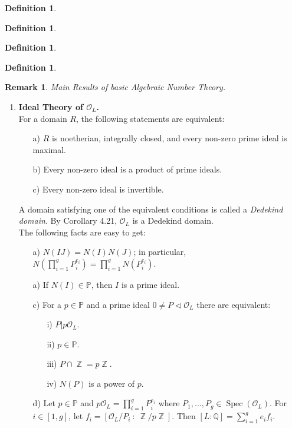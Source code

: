 \documentclass[12pt,a4paper]{report}
\theoremstyle{definition}
\newtheorem{defn}[theorem]{Definition}
\newtheorem{Remark}[theorem]{Remark}
\theoremstyle{num.custom-title}
\DeclareMathOperator{\Z}{\mathbb{Z}}
\DeclareMathOperator{\Spec}{Spec}
\newcommand{\Q}{\mathbb{Q}}
\renewcommand{\O}{\mathcal{O}}
\renewcommand{\P}{\mathbb{P}}
\begin{document}
\begin{defn}

\end{defn}

\begin{defn}

\end{defn}

\begin{defn}

\end{defn}

\begin{defn}

\end{defn}


\begin{Remark}
\emph{Main Results of basic Algebraic Number Theory.}
\begin{enumerate}
\item \textbf{Ideal Theory of $\O_L$.}\\
For a domain $R$, the following statements are equivalent:
\begin{itemize}
\item[a)] $R$ is noetherian, integrally closed, and every non-zero prime ideal is maximal.
\item[b)] Every non-zero ideal is a product of prime ideals.
\item[c)] Every non-zero ideal is invertible.
\end{itemize}
A domain satisfying one of the equivalent conditions is called a \emph{Dedekind domain}. By Corollary 4.21, $\O_L$ is a Dedekind domain.\\
The following facts are easy to get:
\begin{itemize}
\item[a)] $N(IJ)=N(I)N(J)$; in particular, $N(\prod_{i=1}^g P_i^{e_i})=\prod_{i=1}^g N(P_i^{e_i})$.
\item[a)] If $N(I) \in \P$, then $I$ is a prime ideal.
\item[c)] For a $p \in \P$ and a prime ideal $0 \neq P \lhd \O_L$ there are equivalent:
\begin{itemize}
\item[i)] $P | p \O_L$.
\item[ii)] $p \in \P$.
\item[iii)] $P \cap \Z = p\Z$.
\item[iv)] $N(P)$ is a power of $p$.
\end{itemize}
\item[d)] Let $p \in \P$ and $p \O_L = \prod_{i=1}^g P_i^{e_i}$ where $P_1,...,P_g \in \Spec(\O_L)$. For $i \in [1,g]$, let $f_i=[\O_L/P_i \ : \ \Z/p\Z]$. Then $[L:\Q] = \sum_{i=1}^g e_i f_i$.

\end{itemize}
\end{enumerate}
\end{Remark}
\end{document}
